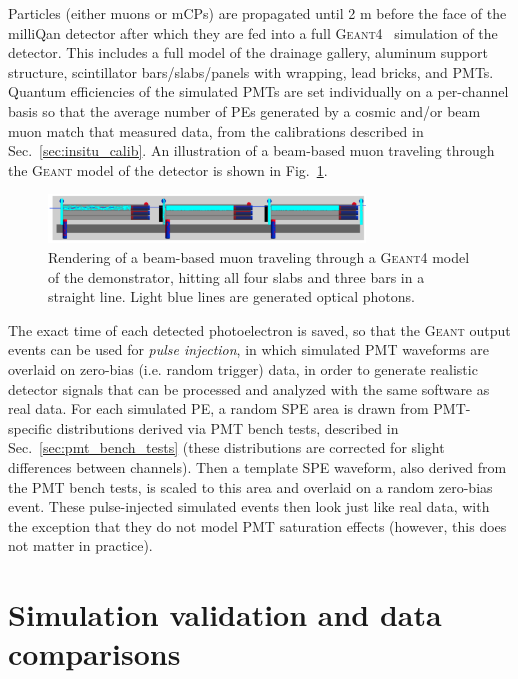 {Particles (either muons or mCPs) are propagated until 2 m before the face of the milliQan detector
after which they are fed into a full \textsc{Geant4}~\cite{geant4} simulation of the detector.
This includes a full model of the drainage gallery, aluminum support structure,
scintillator bars/slabs/panels with wrapping, lead bricks, and PMTs.
Quantum efficiencies of the simulated PMTs are set individually on a per-channel
basis so that the average number of PEs generated by a cosmic and/or beam 
muon match that measured data, from the calibrations described in 
Sec.~\ref{sec:insitu_calib}. An illustration of a beam-based muon
traveling through the \textsc{Geant} model of the detector is 
shown in Fig.~\ref{fig:mq_geant}.

\begin{figure}[t]
  \begin{center}
    \includegraphics[width=0.750\textwidth]{figs/milliq/geant.png}
    \caption{Rendering of a beam-based muon traveling through
      a \textsc{Geant4} model of the demonstrator, hitting all
      four slabs and three bars in a straight line. Light blue
      lines are generated optical photons.
            }
    \label{fig:mq_geant}
  \end{center}
\end{figure}

The exact time of each detected photoelectron is saved, so that the \textsc{Geant} output
events can be used for \textit{pulse injection}, in which simulated PMT waveforms
are overlaid on zero-bias (i.e. random trigger) data, in order to generate realistic
detector signals that can be processed and analyzed with the same software as real data.
For each simulated PE, a random SPE area is drawn from PMT-specific
distributions derived via PMT bench tests, described in Sec.~\ref{sec:pmt_bench_tests}
(these distributions are corrected for slight differences between channels).
Then a template SPE waveform, also derived from the PMT bench tests, is scaled to this
area and overlaid on a random zero-bias event. These pulse-injected simulated events
then look just like real data, with the exception that they do not model
PMT saturation effects (however, this does not matter in practice).

\section{Simulation validation and data comparisons}

}
